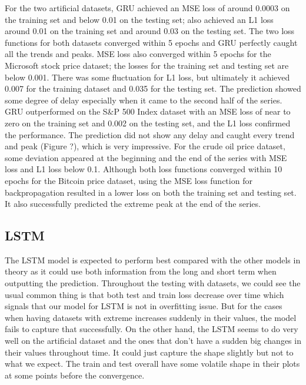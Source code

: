 \documentclass[letterpaper, 10 pt, conference]{ieeeconf}  %
\begin{document}
        For the two artificial datasets, GRU achieved an MSE loss of around 0.0003 on the training set and below 0.01 on the testing set; also achieved an L1 loss around 0.01 on the training set and around 0.03 on the testing set. The two loss functions for both datasets converged within 5 epochs and GRU perfectly caught all the trends and peaks. MSE loss also converged within 5 epochs for the Microsoft stock price dataset; the losses for the training set and testing set are below 0.001. There was some fluctuation for L1 loss, but ultimately it achieved 0.007 for the training dataset and 0.035 for the testing set. The prediction showed some degree of delay especially when it came to the second half of the series. GRU outperformed on the S\&P 500 Index dataset with an MSE loss of near to zero on the training set and 0.002 on the testing set, and the L1 loss confirmed the performance. The prediction did not show any delay and caught every trend and peak (Figure ?), which is very impressive. For the crude oil price dataset, some deviation appeared at the beginning and the end of the series with MSE loss and L1 loss below 0.1. Although both loss functions converged within 10 epochs for the Bitcoin price dataset, using the MSE loss function for backpropagation resulted in a lower loss on both the training set and testing set. It also successfully predicted the extreme peak at the end of the series.

    \subsection{LSTM}

        The LSTM model is expected to perform best compared with the other models in theory as it could use both information from the long and short term when outputting the prediction. Throughout the testing with datasets, we could see the usual common thing is that both test and train loss decrease over time which signals that our model for LSTM is not in overfitting issue. But for the cases when having datasets with extreme increases suddenly in their values, the model fails to capture that successfully. On the other hand, the LSTM seems to do very well on the artificial dataset and the ones that don’t have a sudden big changes in their values throughout time. It could just capture the shape slightly but not to what we expect. The train and test overall have some volatile shape in their plots at some points before the convergence.
\end{document}
